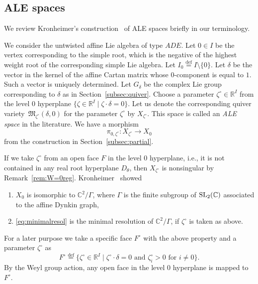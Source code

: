 \documentclass[10pt,a4paper]{amsart}
\newenvironment{aenume}{%
  \begin{enumerate}%
  \renewcommand{\theenumi}{\alph{enumi}}%
  \renewcommand{\labelenumi}{\textup{(\theenumi)}}%
  }{\end{enumerate}}
\theoremstyle{definition}
\numberwithin{equation}{section}
\newcommand{\subsecref}[1]{Section~\ref{#1}}
\newcommand{\remref}[1]{Remark~\ref{#1}}
\newcommand{\defeq}{\overset{\operatorname{\scriptstyle def}}{=}}
\newcommand{\C}{{\mathbb C}}
\newcommand{\R}{{\mathbb R}}
\newcommand{\SL}{\operatorname{\rm SL}}
\newcommand{\M}{{\mathfrak M}} %
\begin{document}
\subsection{ALE spaces}\label{subsec:ALE}

We review Kronheimer's construction~\cite{Kr} of ALE spaces brief\/ly in
our terminology.

We consider the untwisted af\/f\/ine Lie algebra of type $ADE$.
%
Let $0\in I$ be the vertex corresponding to the simple root, which is
the negative of the highest weight root of the corresponding simple
Lie algebra. Let $I_0 \defeq I\setminus \{0\}$. Let $\delta$ be the
vector in the kernel of the af\/f\/ine Cartan matrix whose $0$-component
is equal to $1$. Such a vector is uniquely determined.
%
Let $G_\delta$ be the complex Lie group corresponding to $\delta$ as
in \subsecref{subsec:quiver}. Choose a parameter $\zeta^\circ \in
\R^I$ from the level $0$ hyperplane $\{ \zeta\in\R^I \mid
\zeta\cdot \delta = 0\}$.
%
Let us denote the corresponding quiver variety~$\M_{\zeta^\circ}(\delta,0)$
for the parameter $\zeta^\circ$ by $X_{\zeta^\circ}$.
%
This space is called an {\it ALE space} in the literature.
We have a morphism
\begin{equation}\label{eq:minimalresol}
   \pi_{0,\zeta^\circ}\colon X_{\zeta^\circ} \to X_0
\end{equation}
from the construction in \subsecref{subsec:partial}.

If we take $\zeta^\circ$ from an open face $F$ in the level $0$ hyperplane,
i.e., it is not contained in any real root hyperplane $D_\theta$, then
$X_{\zeta^\circ}$ is nonsingular by \remref{rem:W=0reg}. Kronheimer~\cite{Kr}
showed
\begin{aenume}\itemsep=0pt
\item $X_0$ is isomorphic to $\C^2/\Gamma$, where $\Gamma$ is the
  f\/inite subgroup of $\SL_2(\C)$ associated to the af\/f\/ine Dynkin
  graph,

\item \eqref{eq:minimalresol} is the minimal resolution of
  $\C^2/\Gamma$, if $\zeta^\circ$ is taken as above.
\end{aenume}

For a later purpose we take a specif\/ic face $F^\circ$ with the above
property and a parameter $\zeta^\circ$ as
\begin{equation*}
  F^\circ \defeq \{ \zeta^\circ\in \R^I \mid
  \text{$\zeta^\circ\cdot \delta = 0$ and $\zeta^\circ_i > 0$ for $i\neq 0$}\}.
\end{equation*}
By the Weyl group action, any open face in the level $0$ hyperplane is
mapped to $F^\circ$.
\end{document}
